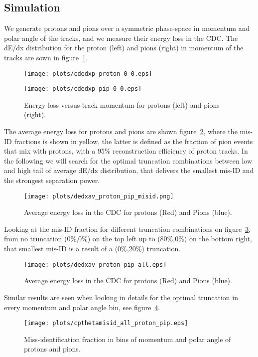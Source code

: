 \subsection{Simulation}
We generate protons and pions over a symmetric phase-space in momentum and polar angle of the tracks, and we measure their energy loss in the CDC. The dE/dx distribution for the proton (left) and pions (right) in momentum of the tracks are sown in figure~\ref{fig.3.4}.
\begin{figure}[h]
    \centering
    \begin{minipage}{18pc}
        \texttt{[image: plots/cdedxp\_proton\_0\_0.eps]}
    \end{minipage}\hspace{3pc}%
    \begin{minipage}{18pc}
        \texttt{[image: plots/cdedxp\_pip\_0\_0.eps]}
    \end{minipage}
    \caption{\label{fig.3.4} Energy loss versus track momentum for protons (left) and pions (right).}
\end{figure}
The average energy loss for protons and pions are shown figure~\ref{fig.3.5}, where the mis-ID fractions is shown in yellow, the latter is defined as the fraction of pion events that mix with protons, with a 95$\%$ reconstruction efficiency of proton tracks. In the following we will search for the optimal truncation combinations between low and high tail of average dE/dx distribution, that delivers the smallest mis-ID and the strongest separation power.
\begin{figure}[h]
    \centering
    \texttt{[image: plots/dedxav\_proton\_pip\_misid.png]}
    \caption{\label{fig.3.5} Average energy loss in the CDC for protons (Red) and Pions (blue).}
\end{figure}
Looking at the mis-ID fraction for different truncation combinations on figure~\ref{fig.3.6}, from no truncation (0$\%$,0$\%$) on the top left up to (80$\%$,0$\%$) on the bottom right, that smallest mis-ID is a result of a (0$\%$,20$\%$) truncation.
\begin{figure}[h]
    \centering
    \texttt{[image: plots/dedxav\_proton\_pip\_all.eps]}
    \caption{\label{fig.3.6} Average energy loss in the CDC for protons (Red) and Pions (blue).}
\end{figure}
Similar results are seen when looking in details for the optimal truncation in every momentum and polar angle bin, see figure~\ref{fig.3.7}.
\begin{figure}[h]
    \centering
    \texttt{[image: plots/cpthetamisid\_all\_proton\_pip.eps]}
    \caption{\label{fig.3.7} Miss-identification fraction in bins of momentum and polar angle of protons and pions.}
\end{figure}
